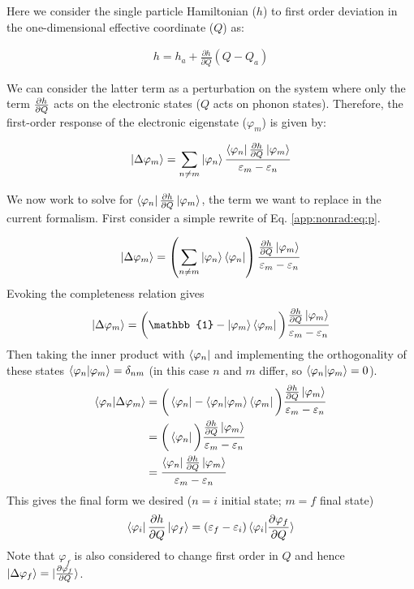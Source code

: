 Here we consider the single particle Hamiltonian ($h$) to first order deviation in the one-dimensional effective coordinate ($Q$) as:

\begin{align}
    h=h_{a}+\frac{\partial h}{\partial Q} (Q-Q_{a})
\end{align}

We can consider the latter term as a perturbation on the system where only the term $\frac{\partial h}{\partial Q}$ acts on the electronic states ($Q$ acts on phonon states). Therefore, the first-order response of the electronic eigenstate ($\varphi_m$) is given by:

\begin{align}
    \ket{\Delta\varphi_m} = \sum_{n\neq m} \ket{\varphi_n} \frac{\bra{\varphi_n} \frac{\partial h}{\partial Q} \ket{\varphi_m}}{\varepsilon_m-\varepsilon_n} \label{app:nonrad:eq:p}
\end{align}

We now work to solve for $\bra{\varphi_n} \frac{\partial h}{\partial Q} \ket{\varphi_m}$, the term we want to replace in the current formalism. First consider a simple rewrite of Eq. \ref{app:nonrad:eq:p}.

\begin{align}
    \ket{ \Delta\varphi_m} =  \left(\sum_{n\neq m} \ket{\varphi_n}\bra{\varphi_n}\right)\frac{ \frac{\partial h}{\partial Q} \ket{\varphi_m}}{\varepsilon_m-\varepsilon_n}
\end{align}
Evoking the completeness relation gives
\begin{align}
    \ket{ \Delta\varphi_m} = \bigg(\mathbb{1}- \ket{\varphi_m}\bra{\varphi_m}\bigg)\frac{ \vhq \ket{\varphi_m}}{\varepsilon_m-\varepsilon_n}
\end{align}
Then taking the inner product with $\bra{\varphi_n}$ and implementing the orthogonality of these states $\braket{\varphi_n|\varphi_m}=\delta_{nm}$ (in this case $n$ and $m$ differ, so $\braket{\varphi_n|\varphi_m}=0$).
\begin{align}
    \braket{\varphi_n|\Delta\varphi_m} &= \bigg(\bra{\varphi_n}- \braket{\varphi_n|\varphi_m}\bra{\varphi_m}\bigg)\frac{ \frac{\partial h}{\partial Q} \ket{\varphi_m}}{\varepsilon_m-\varepsilon_n} \\
    &= \bigg(\bra{\varphi_n}\bigg)\frac{ \frac{\partial h}{\partial Q} \ket{\varphi_m}}{\varepsilon_m-\varepsilon_n} \\
    &= \frac{\bra{\varphi_n} \frac{\partial h}{\partial Q} \ket{\varphi_m}}{\varepsilon_m-\varepsilon_n}
\end{align}
This gives the final form we desired ($n=i$ initial state; $m=f$ final state)
\begin{align}
    \bra{\varphi_i} \frac{\partial h}{\partial Q} \ket{\varphi_f} = (\varepsilon_f-\varepsilon_i)\braket{\varphi_i|\frac{\partial \varphi_f}{\partial Q}}
\end{align}
Note that $\varphi_f$ is also considered to change first order in $Q$ and hence $\ket{\Delta\varphi_f}=\ket{\frac{\partial \varphi_f}{\partial Q}}$.


